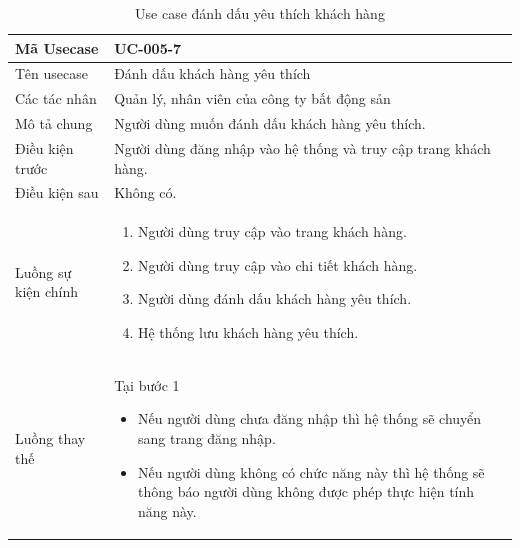 \documentclass[12pt,a4paper]{article}
\begin{document}
    \begin{table}[H]
        \centering
        \begin{tabular}{|p{3.5cm}|p{11.5cm}|c|}
            \hline
            Mã Usecase      & UC-005-7                                                        \\
            \hline
            Tên usecase     & Đánh dấu khách hàng yêu thích                                   \\
            \hline
            Các tác nhân    & Quản lý, nhân viên của công ty bất động sản                     \\
            \hline
            Mô tả chung     & Người dùng muốn đánh dấu khách hàng yêu thích.                  \\
            \hline

            Điều kiện trước & Người dùng đăng nhập vào hệ thống và truy cập trang khách hàng. \\
            \hline

            Điều kiện sau   & Không có.                                                       \\
            \hline

            Luồng sự kiện chính & \vspace{-.8cm}\begin{enumerate}
                                                    \item Người dùng truy cập vào trang khách hàng.
                                                    \item Người dùng truy cập vào chi tiết khách hàng.
                                                    \item Người dùng đánh dấu khách hàng yêu thích.
                                                    \item Hệ thống lưu khách hàng yêu thích.
            \end{enumerate}
            \\
            \hline
            Luồng thay thế & Tại bước 1\newline
            \vspace{-.8cm}\begin{itemize}
                              \item Nếu người dùng chưa đăng nhập thì hệ thống sẽ chuyển sang trang đăng nhập.
                              \item Nếu người dùng không có chức năng này thì hệ thống sẽ thông báo người dùng không được phép thực hiện tính năng này.
            \end{itemize}
            \\ \hline
        \end{tabular}
        \caption{Use case đánh dấu yêu thích khách hàng}
    \end{table}
\end{document}
